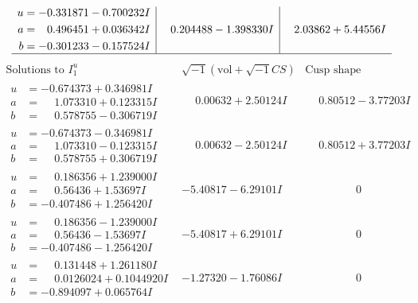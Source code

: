 \documentclass[1p]{elsarticle_modified}
\theoremstyle{definition}
\newcommand{\I}{\sqrt{-1}}
\begin{document}
$$\begin{array}{c|c|c}
\begin{aligned}
u &= -0.331871 - 0.700232 I \\
a &= \phantom{-}0.496451 + 0.036342 I \\
b &= -0.301233 - 0.157524 I\end{aligned}
 & \phantom{-}0.204488 - 1.398330 I & \phantom{-}2.03862 + 5.44556 I\\
 \hline 
 \end{array}$$\newpage$$\begin{array}{c|c|c}  
\text{Solutions to }I^u_{1}& \I (\text{vol} + \sqrt{-1}CS) & \text{Cusp shape}\\
 \hline 
\begin{aligned}
u &= -0.674373 + 0.346981 I \\
a &= \phantom{-}1.073310 + 0.123315 I \\
b &= \phantom{-}0.578755 - 0.306719 I\end{aligned}
 & \phantom{-}0.00632 + 2.50124 I & \phantom{-}0.80512 - 3.77203 I \\ \hline\begin{aligned}
u &= -0.674373 - 0.346981 I \\
a &= \phantom{-}1.073310 - 0.123315 I \\
b &= \phantom{-}0.578755 + 0.306719 I\end{aligned}
 & \phantom{-}0.00632 - 2.50124 I & \phantom{-}0.80512 + 3.77203 I \\ \hline\begin{aligned}
u &= \phantom{-}0.186356 + 1.239000 I \\
a &= \phantom{-}0.56436 + 1.53697 I \\
b &= -0.407486 + 1.256420 I\end{aligned}
 & -5.40817 - 6.29101 I & \phantom{-0.000000 } 0 \\ \hline\begin{aligned}
u &= \phantom{-}0.186356 - 1.239000 I \\
a &= \phantom{-}0.56436 - 1.53697 I \\
b &= -0.407486 - 1.256420 I\end{aligned}
 & -5.40817 + 6.29101 I & \phantom{-0.000000 } 0 \\ \hline\begin{aligned}
u &= \phantom{-}0.131448 + 1.261180 I \\
a &= \phantom{-}0.0126024 + 0.1044920 I \\
b &= -0.894097 + 0.065764 I\end{aligned}
 & -1.27320 - 1.76086 I & \phantom{-0.000000 } 0 \\ \hline\begin{aligned}

\end{aligned}
\end{array}$$
\end{document}
